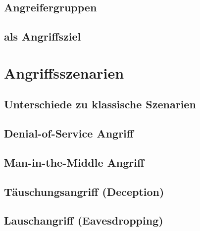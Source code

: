 \documentclass[final,bibliography=totocnumbered]{include/sikseminar}
\begin{document}

\subsection{Angreifergruppen}\label{subsec:angreifergruppen}

\subsection{ als Angriffsziel}\label{subsec:angriffsziel}

\section{Angriffsszenarien}\label{sec:angriffszenarien}
\subsection{Unterschiede zu klassische Szenarien}\label{subsec:klassisch}
\subsection{Denial-of-Service Angriff}\label{subsec:dos}
\subsection{Man-in-the-Middle Angriff}\label{subsec:mitm}
\subsection{T\"auschungsangriff (Deception)}\label{subsec:tauschung} %
\subsection{Lauschangriff (Eavesdropping)}\label{subsec:lauschen} %
\end{document}
